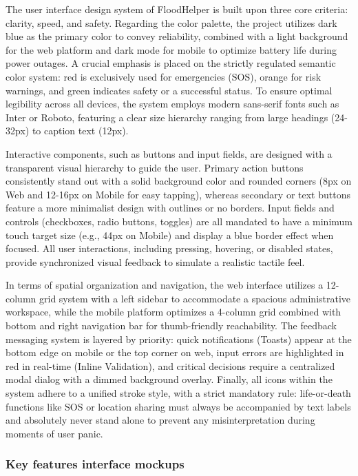 \documentclass[../Main.tex]{subfiles}
\begin{document}
The user interface design system of FloodHelper is built upon three core criteria: clarity, speed, and safety. Regarding the color palette, the project utilizes dark blue as the primary color to convey reliability, combined with a light background for the web platform and dark mode for mobile to optimize battery life during power outages. A crucial emphasis is placed on the strictly regulated semantic color system: red is exclusively used for emergencies (SOS), orange for risk warnings, and green indicates safety or a successful status. To ensure optimal legibility across all devices, the system employs modern sans-serif fonts such as Inter or Roboto, featuring a clear size hierarchy ranging from large headings (24-32px) to caption text (12px).

Interactive components, such as buttons and input fields, are designed with a transparent visual hierarchy to guide the user. Primary action buttons consistently stand out with a solid background color and rounded corners (8px on Web and 12-16px on Mobile for easy tapping), whereas secondary or text buttons feature a more minimalist design with outlines or no borders. Input fields and controls (checkboxes, radio buttons, toggles) are all mandated to have a minimum touch target size (e.g., 44px on Mobile) and display a blue border effect when focused. All user interactions, including pressing, hovering, or disabled states, provide synchronized visual feedback to simulate a realistic tactile feel.

In terms of spatial organization and navigation, the web interface utilizes a 12-column grid system with a left sidebar to accommodate a spacious administrative workspace, while the mobile platform optimizes a 4-column grid combined with bottom and right navigation bar for thumb-friendly reachability. The feedback messaging system is layered by priority: quick notifications (Toasts) appear at the bottom edge on mobile or the top corner on web, input errors are highlighted in red in real-time (Inline Validation), and critical decisions require a centralized modal dialog with a dimmed background overlay. Finally, all icons within the system adhere to a unified stroke style, with a strict mandatory rule: life-or-death functions like SOS or location sharing must always be accompanied by text labels and absolutely never stand alone to prevent any misinterpretation during moments of user panic.

\subsubsection{Key features interface mockups}
\end{document}
